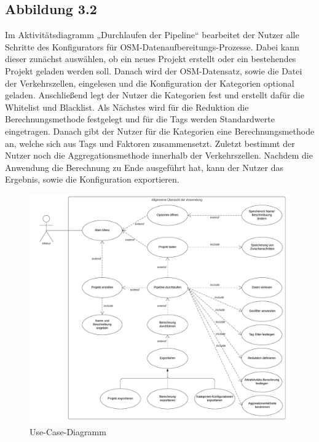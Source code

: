 \documentclass[parskip=full]{scrartcl} %
\begin{document}
\subsection*{Abbildung 3.2}
Im Aktivitätsdiagramm „Durchlaufen der Pipeline“ bearbeitet der Nutzer alle Schritte des Konfigurators für OSM-Datenaufbereitungs-Prozesse. Dabei kann dieser zunächst auswählen, ob ein neues Projekt erstellt oder ein bestehendes Projekt geladen werden soll. Danach wird der OSM-Datensatz, sowie die Datei der Verkehrszellen, eingelesen und die Konfiguration der Kategorien optional geladen. Anschließend legt der Nutzer die Kategorien fest und erstellt dafür die Whitelist und Blacklist. Als Nächstes wird für die Reduktion die Berechnungsmethode festgelegt und für die Tags werden Standardwerte eingetragen. Danach gibt der Nutzer für die Kategorien eine Berechnungsmethode an, welche sich aus Tags und Faktoren zusammensetzt. Zuletzt bestimmt der Nutzer noch die Aggregationsmethode innerhalb der Verkehrszellen. Nachdem die Anwendung die Berechnung zu Ende ausgeführt hat, kann der Nutzer das Ergebnis, sowie die Konfiguration exportieren. 
\begin{figure}
    \centering
    \includegraphics[width=1\textwidth]{pictures/Anwendungsfalldiagramm.png}
    \caption{Use-Case-Diagramm}
\end{figure}
\end{document}
